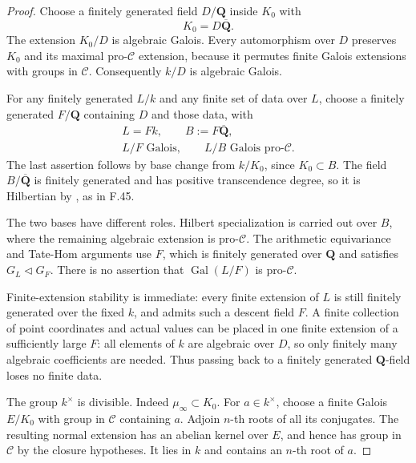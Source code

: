 \begin{proof}

Choose a finitely generated field \(D/\mathbf Q\) inside \(K_0\) with
\[
                      K_0=D\overline{\mathbf Q}.           \tag{F.46.1}
\]
The extension \(K_0/D\) is algebraic Galois. Every automorphism over
\(D\) preserves \(K_0\) and its maximal pro-\(\mathcal C\)
extension, because it permutes finite Galois extensions with groups in
\(\mathcal C\). Consequently \(k/D\) is algebraic Galois.

For any finitely generated \(L/k\) and any finite set of data over
\(L\), choose a finitely generated \(F/\mathbf Q\) containing \(D\)
and those data, with
\[
 \begin{gathered}
  L=Fk,\qquad B:=F\overline{\mathbf Q},\\
  L/F\text{ Galois},\qquad L/B\text{ Galois pro-}\mathcal C.
 \end{gathered}                                           \tag{F.46.2}
\]
The last assertion follows by base change from \(k/K_0\), since
\(K_0\subset B\). The field \(B/\overline{\mathbf Q}\) is finitely
generated and has positive transcendence degree, so it is Hilbertian by
\citet[Theorem~1.2 and Corollary~3.2]{F_BarySorokerParan2013}, as in F.45.

The two bases have different roles. Hilbert specialization is carried out
over \(B\), where the remaining algebraic extension is pro-\(\mathcal C\).
The arithmetic equivariance and Tate-Hom arguments use \(F\), which is
finitely generated over \(\mathbf Q\) and satisfies
\(G_L\triangleleft G_F\). There is no assertion that
\(\operatorname{Gal}(L/F)\) is pro-\(\mathcal C\).

Finite-extension stability is immediate: every finite extension of
\(L\) is still finitely generated over the fixed \(k\), and admits
such a descent field \(F\). A finite collection of point coordinates
and actual values can be placed in one finite extension of a sufficiently
large \(F\): all elements of \(k\) are algebraic over \(D\), so only
finitely many algebraic coefficients are needed. Thus passing back to a
finitely generated \(\mathbf Q\)-field loses no finite data.


The group \(k^\times\) is divisible. Indeed \(\mu_\infty\subset K_0\).
For \(a\in k^\times\), choose a finite Galois \(E/K_0\) with group in
\(\mathcal C\) containing \(a\). Adjoin \(n\)-th roots of all its
conjugates. The resulting normal extension has an abelian kernel over
\(E\), and hence has group in \(\mathcal C\) by the closure hypotheses.
It lies in \(k\) and contains an \(n\)-th root of \(a\).


\end{proof}
